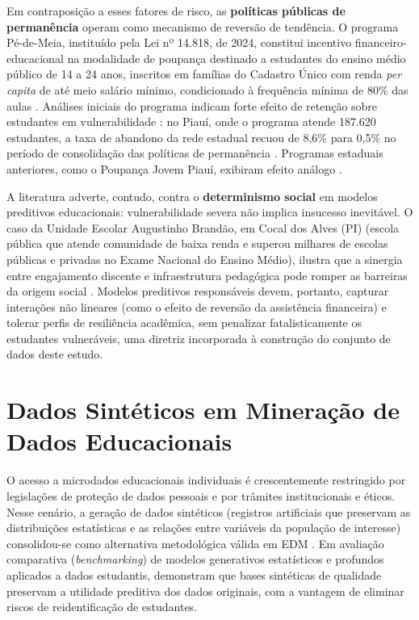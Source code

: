 Em contraposição a esses fatores de risco, as \textbf{políticas públicas de permanência} operam como mecanismo de reversão de tendência. O programa Pé-de-Meia, instituído pela Lei nº 14.818, de 2024, constitui incentivo financeiro-educacional na modalidade de poupança destinado a estudantes do ensino médio público de 14 a 24 anos, inscritos em famílias do Cadastro Único com renda \textit{per capita} de até meio salário mínimo, condicionado à frequência mínima de 80\% das aulas \cite{brasil2024lei14818, mds2024cadunico}. Análises iniciais do programa indicam forte efeito de retenção sobre estudantes em vulnerabilidade \cite{santos2026}: no Piauí, onde o programa atende 187.620 estudantes, a taxa de abandono da rede estadual recuou de 8,6\% para 0,5\% no período de consolidação das políticas de permanência \cite{todospelaeducacaopiaui, inep2025, minutomt2026}. Programas estaduais anteriores, como o Poupança Jovem Piauí, exibiram efeito análogo \cite{palominio2025}.

A literatura adverte, contudo, contra o \textbf{determinismo social} em modelos preditivos educacionais: vulnerabilidade severa não implica insucesso inevitável. O caso da Unidade Escolar Augustinho Brandão, em Cocal dos Alves (PI) (escola pública que atende comunidade de baixa renda e superou milhares de escolas públicas e privadas no Exame Nacional do Ensino Médio), ilustra que a sinergia entre engajamento discente e infraestrutura pedagógica pode romper as barreiras da origem social \cite{seducpi}. Modelos preditivos responsáveis devem, portanto, capturar interações não lineares (como o efeito de reversão da assistência financeira) e tolerar perfis de resiliência acadêmica, sem penalizar fatalisticamente os estudantes vulneráveis, uma diretriz incorporada à construção do conjunto de dados deste estudo.

\section{Dados Sintéticos em Mineração de Dados Educacionais}

O acesso a microdados educacionais individuais é crescentemente restringido por legislações de proteção de dados pessoais e por trâmites institucionais e éticos. Nesse cenário, a geração de dados sintéticos (registros artificiais que preservam as distribuições estatísticas e as relações entre variáveis da população de interesse) consolidou-se como alternativa metodológica válida em EDM \cite{kostopoulos2026}. Em avaliação comparativa (\textit{benchmarking}) de modelos generativos estatísticos e profundos aplicados a dados estudantis,  demonstram que bases sintéticas de qualidade preservam a utilidade preditiva dos dados originais, com a vantagem de eliminar riscos de reidentificação de estudantes.

